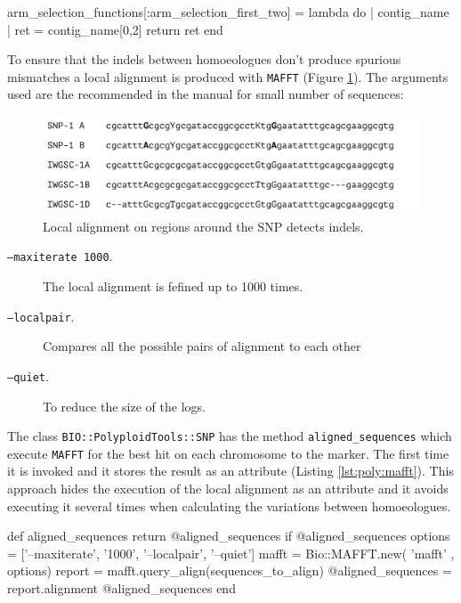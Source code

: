 \begin{code}[language=Ruby,caption=Example function that assigns a chromosome from the two first letters of the scaffold, label=lst:poly:chromsomeParsing]
arm_selection_functions[:arm_selection_first_two] = lambda do | contig_name |
  ret = contig_name[0,2]       
  return ret
end
\end{code}

To ensure that the \acrshort{indels} between homoeologues don't produce spurious mismatches a local alignment is produced with \verb|MAFFT| (Figure \ref{fig:poly:localSequence}). 
The arguments used are the recommended in the manual for small number of sequences:

\begin{figure}
\includegraphics[width=1\textwidth]{PolyMarker/Figures/aln/localAlignment.pdf}
\caption{Local alignment on regions around the SNP detects \acrshort{indels}.}
\label{fig:poly:localSequence}
\end{figure}

\begin{description}
\item[\texttt{--maxiterate 1000}.] The local alignment is fefined up to 1000 times.
\item[\texttt{--localpair}.] Compares all the possible pairs of alignment to each other
\item[\texttt{--quiet}.] To reduce the size of the logs.  
\end{description}

The class \verb|BIO::PolyploidTools::SNP| has the method \verb|aligned_sequences| which execute \verb|MAFFT| for the best hit on each chromosome to the marker. 
The first time it is invoked and it stores the result as an attribute (Listing \ref{lst:poly:mafft}).
This approach hides the execution of the local alignment as an attribute and it avoids executing it several times when calculating the variations between homoeologues. 

\begin{code}[language=Ruby,caption=Method in \texttt{BIO::PolyploidTools::SNP} that calculates the local alignment, label=lst:poly:mafft]
def aligned_sequences
  return @aligned_sequences if @aligned_sequences
  options = ['--maxiterate', '1000', '--localpair', '--quiet']
  mafft = Bio::MAFFT.new( 'mafft' , options)
  report = mafft.query_align(sequences_to_align)
  @aligned_sequences = report.alignment
  @aligned_sequences
end
\end{code}


